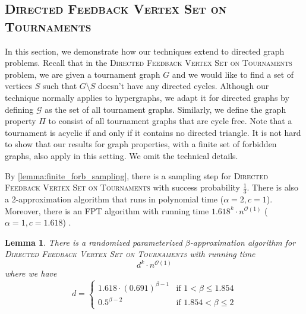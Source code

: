 \documentclass[letterpaper,11pt]{article}
\newcommand{\1}[1]{\mathds{1}\left[#1\right]}
\newcommand{\Oh}{\mathcal{O}}
\newtheorem{lemma}[theorem]{Lemma}
\newcommand{\dfvst}{\textsc{Directed Feedback Vertex Set on Tournaments}\xspace}
\begin{document}
 
\subsection{\dfvst}
In this section, we demonstrate how our techniques extend to directed graph problems.
Recall that in the \dfvst problem, we are given a tournament graph $G$ and we would like to
find  a set of vertices $S$ such that $G \setminus S$ doesn't have any directed cycles.
Although our technique normally applies to hypergraphs, we adapt it
for directed graphs by defining $\mathcal{G}$ as the set of all tournament
graphs. 
Similarly, we define the graph property $\Pi$ to consist of all tournament graphs that are cycle free.
Note that a tournament is acyclic if and only if it contains no directed triangle.
It is not hard to show that our results for graph properties, with a finite set of forbidden graphs,
also apply in this setting. We omit the technical details.

By \cref{lemma:finite_forb_sampling}, there is a sampling step for \dfvst
with success probability $\frac{1}{3}$. There is also a 2-approximation algorithm
that runs in polynomial time \cite{lokshtanov2ApproximatingFeedbackVertex2021} ($\alpha = 2, c = 1$).
Moreover, there is an FPT algorithm with running time $1.618^{k} \cdot n^{\Oh(1)}$ ($\alpha = 1, c = 1.618$) \cite{kumarFasterExactParameterized2016}.

\begin{lemma}\label{lemma:dfvst_running_time}
	There is a randomized parameterized $\beta$-approximation algorithm
	for \dfvst with running time
	\begin{equation*}
		d^{k} \cdot n^{\Oh(1)}
	\end{equation*}
	where we have
	\begin{equation*}d = \begin{cases}
			1.618 \cdot \left(0.691\right) ^{\beta - 1} &\text{if } 1 < \beta \leq 1.854\\			
			0.5^{\beta - 2} &\text{if } 1.854 < \beta \leq 2 
		\end{cases}
	\end{equation*}	
\end{lemma}
\end{document}
